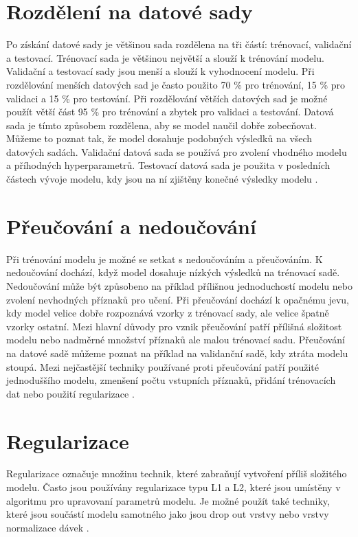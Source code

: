 \documentclass[FM,BP]{tulthesis}
\begin{document}
\section{Rozdělení na datové sady}
Po získání datové sady je většinou sada rozdělena na tři částí: trénovací, validační a testovací. Trénovací sada je většinou největší a slouží k trénování modelu. Validační a testovací sady jsou menší a slouží k vyhodnocení modelu. Při rozdělování menších datových sad je často použito 70 \% pro trénování, 15 \% pro validaci a 15 \% pro testování. Při rozdělování větších datových sad je možné použít větší část 95 \% pro trénování a zbytek pro validaci a testování. Datová sada je tímto způsobem rozdělena, aby se model naučil dobře zobecňovat. Můžeme to poznat tak, že model dosahuje podobných výsledků na všech datových sadách. Validační datová sada se používá pro zvolení vhodného modelu a příhodných hyperparametrů. Testovací datová sada je použita v posledních částech vývoje modelu, kdy jsou na ní zjištěny konečné výsledky modelu \cite{burkov2019hundred}.

\section{Přeučování a nedoučování}
Při trénování modelu je možné se setkat s nedoučováním a přeučováním. K nedoučování dochází, když model dosahuje nízkých výsledků na trénovací sadě. Nedoučování může být způsobeno na příklad přílišnou jednoduchostí modelu nebo zvolení nevhodných příznaků pro učení. Při přeučování dochází k opačnému jevu, kdy model velice dobře rozpoznává vzorky z trénovací sady, ale velice špatně vzorky ostatní. Mezi hlavní důvody pro vznik přeučování patří přílišná složitost modelu nebo nadměrné množství příznaků ale malou trénovací sadu. Přeučování na datové sadě můžeme poznat na příklad na validanční sadě, kdy ztráta modelu stoupá. Mezi nejčastější techniky používané proti přeučování patří použité jednoduššího modelu, zmenšení počtu vstupních příznaků, přidání trénovacích dat nebo použití regularizace \cite{burkov2019hundred}.

\section{Regularizace}
Regularizace označuje množinu technik, které zabraňují vytvoření příliš složitého modelu. Často jsou používány regularizace typu L1 a L2, které jsou umístěny v algoritmu pro upravovaní parametrů modelu. Je možné použít také techniky, které jsou součástí modelu samotného jako jsou drop out vrstvy nebo vrstvy normalizace dávek \cite{burkov2019hundred}.
\end{document}
